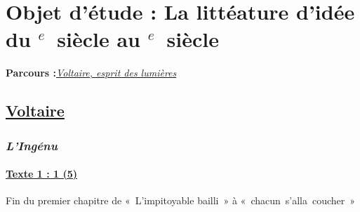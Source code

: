\documentclass[12pt,a4paper]{article}
\begin{document}
		\section[Voltaire, esprit des Lumi\`eres]{Objet d'\'etude : La litt\'eature d'id\'ee du \textsc{}$^{e}$~siècle au \textsc{}$^{e}$~siècle}
		\textbf{Parcours :}\textit{\underline{Voltaire, esprit des lumi\`eres}}
			\subsection{\href{.extra/Bio/Voltaire.pdf}{Voltaire}}
				\subsubsection[L'ing\'enu]{\textit{L'Ing\'enu}}
					\paragraph[Texte 1 (5)]{\textbf{\underline{Texte 1 : 1 (5)}}}
		Fin du premier chapitre de «~L'impitoyable bailli~» \`a «~chacun~s'alla~coucher~»
\end{document}
